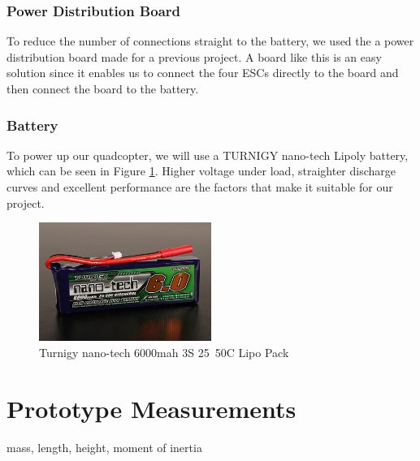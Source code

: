 \subsubsection{Power Distribution Board}
To reduce the number of connections straight to the battery, we used the a power distribution board made for a previous project. A board like this is an easy solution since it enables us to connect the four ESCs directly to the board and then connect the board to the battery.

\clearpage

\subsubsection{Battery}
To power up our quadcopter, we will use a TURNIGY nano-tech Lipoly battery, which can be seen in Figure \ref{battery}. Higher voltage under load, straighter discharge curves and excellent performance are the factors that make it suitable for our project. 

\begin{figure}[H]
  \centering
    \includegraphics[width=0.5\textwidth]{images/battery.jpg}
	\caption{Turnigy nano-tech 6000mah 3S 25~50C Lipo Pack}
	\label{battery}
\end{figure}

\section{Prototype Measurements}
mass, length, height, moment of inertia

